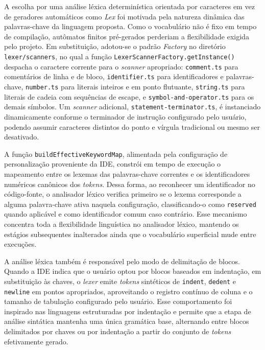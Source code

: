 A escolha por uma análise léxica determinística orientada por caracteres em vez de geradores automáticos como \textit{Lex} foi motivada pela natureza dinâmica das palavras-chave da linguagem proposta. Como o vocabulário não é fixo em tempo de compilação, autômatos finitos pré-gerados perderiam a flexibilidade exigida pelo projeto. Em substituição, adotou-se o padrão \textit{Factory} no diretório \texttt{lexer/scanners}, no qual a função \texttt{LexerScannerFactory.}\allowbreak\texttt{getInstance()} despacha o caractere corrente para o \textit{scanner} apropriado: \texttt{comment.ts} para comentários de linha e de bloco, \texttt{identifier.ts} para identificadores e palavras-chave, \texttt{number.ts} para literais inteiros e em ponto flutuante, \texttt{string.ts} para literais de cadeia com sequências de escape, e \texttt{symbol-and-}\allowbreak\texttt{operator.ts} para os demais símbolos. Um \textit{scanner} adicional, \texttt{statement-}\allowbreak\texttt{terminator.ts}, é instanciado dinamicamente conforme o terminador de instrução configurado pelo usuário, podendo assumir caracteres distintos do ponto e vírgula tradicional ou mesmo ser desativado.

A função \texttt{buildEffective}\allowbreak\texttt{KeywordMap}, alimentada pela configuração de personalização proveniente da IDE, constrói em tempo de execução o mapeamento entre os lexemas das palavras-chave correntes e os identificadores numéricos canônicos dos \textit{tokens}. Dessa forma, ao reconhecer um identificador no código-fonte, o analisador léxico verifica primeiro se o lexema corresponde a alguma palavra-chave ativa naquela configuração, classificando-o como \texttt{reserved} quando aplicável e como identificador comum caso contrário. Esse mecanismo concentra toda a flexibilidade linguística no analisador léxico, mantendo os estágios subsequentes inalterados ainda que o vocabulário superficial mude entre execuções.

A análise léxica também é responsável pelo modo de delimitação de blocos. Quando a IDE indica que o usuário optou por blocos baseados em indentação, em substituição às chaves, o \textit{lexer} emite \textit{tokens} sintéticos de \texttt{indent}, \texttt{dedent} e \texttt{newline} em pontos apropriados, aproveitando o registro contínuo de coluna e o tamanho de tabulação configurado pelo usuário. Esse comportamento foi inspirado nas linguagens estruturadas por indentação e permite que a etapa de análise sintática mantenha uma única gramática base, alternando entre blocos delimitados por chaves ou por indentação a partir do conjunto de \textit{tokens} efetivamente gerado.

